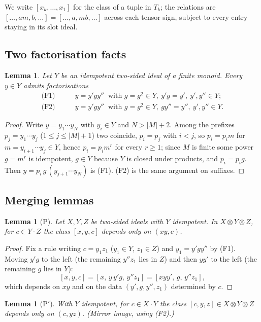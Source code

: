 \documentclass[11pt]{amsart}
\newtheorem{lem}[thm]{Lemma}
\theoremstyle{definition}
\begin{document}
We write $[x_k,\dots,x_1]$ for the class of a tuple in $T_k$; the relations
are $[\dots,am,b,\dots]=[\dots,a,mb,\dots]$ across each tensor sign, subject
to every entry staying in its slot ideal.

\subsection{Two factorisation facts}
\begin{lem}\label{lem:F}
Let $Y$ be an idempotent two-sided ideal of a finite monoid. Every $y\in Y$
admits factorisations
\begin{align*}
\text{(F1)}\qquad& y=y'gy''\ \text{ with }g=g^2\in Y,\ y'g=y',\ y',y''\in Y;\\
\text{(F2)}\qquad& y=y'gy''\ \text{ with }g=g^2\in Y,\ gy''=y'',\ y',y''\in Y.
\end{align*}
\end{lem}
\begin{proof}
Write $y=y_1\cdots y_N$ with $y_i\in Y$ and $N>|M|+2$. Among the prefixes
$p_j=y_1\cdots y_j$ ($1\le j\le|M|+1$) two coincide, $p_i=p_j$ with $i<j$, so
$p_i=p_im$ for $m=y_{i+1}\cdots y_j\in Y$, hence $p_i=p_im^r$ for every $r\ge1$;
since $M$ is finite some power $g=m^r$ is idempotent, $g\in Y$ because $Y$ is
closed under products, and $p_i=p_ig$. Then $y=p_i\,g\,(y_{j+1}\cdots y_N)$ is (F1).
(F2) is the same argument on suffixes.
\end{proof}

\subsection{Merging lemmas}
\begin{lem}[P]\label{lem:P}
Let $X,Y,Z$ be two-sided ideals with $Y$ idempotent. In $X\otimes Y\otimes Z$,
for $c\in Y\cdot Z$ the class $[x,y,c]$ depends only on $(xy,c)$.
\end{lem}
\begin{proof}
Fix a rule writing $c=y_1z_1$ ($y_1\in Y$, $z_1\in Z$) and $y_1=y'gy''$ by (F1).
Moving $y'g$ to the left (the remaining $y''z_1$ lies in $Z$) and then $yy'$ to
the left (the remaining $g$ lies in $Y$):
\[
[x,y,c]=[x,\,y\,y'g,\,y''z_1]=[xyy',\,g,\,y''z_1],
\]
which depends on $xy$ and on the data $(y',g,y'',z_1)$ determined by $c$.
\end{proof}
\begin{lem}[P$'$]\label{lem:Pp}
With $Y$ idempotent, for $c\in X\cdot Y$ the class $[c,y,z]\in X\otimes Y\otimes Z$
depends only on $(c,yz)$. (Mirror image, using (F2).)
\end{lem}
\end{document}
